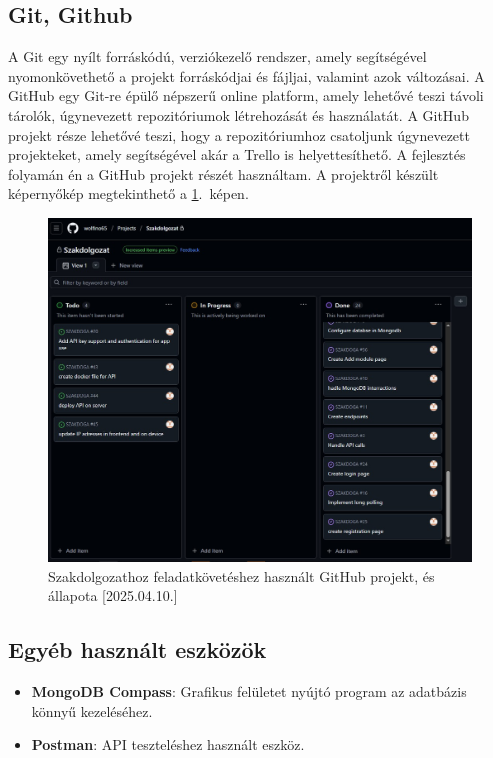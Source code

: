 \documentclass{thesis-ekf}
\theoremstyle{definition}
\theoremstyle{remark}
\begin{document}
	\subsection{Git, Github}
	A Git egy nyílt forráskódú, verziókezelő rendszer, amely segítségével nyomonkövethető a projekt forráskódjai és fájljai, valamint azok változásai. A GitHub egy Git-re épülő népszerű online platform, amely lehetővé teszi távoli tárolók, úgynevezett repozitóriumok létrehozását és használatát. A GitHub projekt része lehetővé teszi, hogy a repozitóriumhoz csatoljunk úgynevezett projekteket, amely segítségével akár a Trello is helyettesíthető. A fejlesztés folyamán én a GitHub projekt részét használtam. A projektről készült képernyőkép megtekinthető a \ref{img_git}.~képen.
	\begin{figure}[!ht]
		\centering
		\includegraphics[width=15cm]{github_project}
		\caption{Szakdolgozathoz feladatkövetéshez használt GitHub projekt, és állapota [2025.04.10.]}
		\label{img_git}
	\end{figure}
	\subsection{Egyéb használt eszközök}
	\begin{itemize}
		\item \textbf{MongoDB Compass}: Grafikus felületet nyújtó program az adatbázis könnyű kezeléséhez.
		\item \textbf{Postman}: API teszteléshez használt eszköz.
	\end{itemize}
\end{document}
